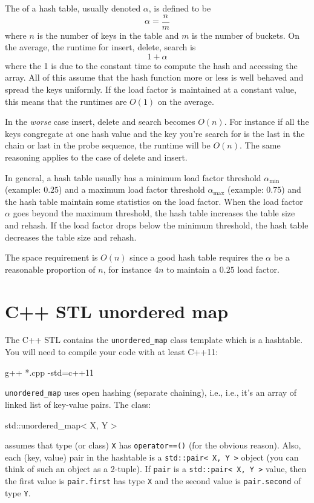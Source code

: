 The  of a hash table, usually denoted $\alpha$, 
is defined to be
\[
\alpha = \frac{n}{m}
\]
where $n$ is the number of keys in the table and $m$ is the number of buckets.
On the average, the runtime for insert, delete, search is
\[
1 + \alpha
\]
where the 1 is due to the constant time to compute the hash and accessing the array.
All of this assume that the hash function more or less is well behaved and spread
the keys uniformly.
If the load factor is maintained at a constant value, this means
that the runtimes are $O(1)$ on the average.

In the \textit{worse} case 
insert, delete and search becomes $O(n)$.
For instance if all the keys congregate at one hash value and the 
key you're search for is the last in the chain or last in the probe sequence,
the runtime will be $O(n)$.
The same reasoning applies to the case of delete and insert.

In general, a hash table usually has a minimum load factor threshold
$\alpha_{\operatorname{min}}$ (example: $0.25$)
and a maximum load factor threshold
$\alpha_{\operatorname{max}}$ (example: $0.75$)
and the hash table maintain some statistics on the load factor.
When the load factor $\alpha$ goes beyond the maximum threshold, 
the hash table increases the table size and rehash.
If the load factor drops below the minimum threshold, the hash table
decreases the table size and rehash.

The space requirement is $O(n)$ since 
a good hash table requires the $\alpha$ be a reasonable
proportion of $n$, for instance $4n$ to maintain a $0.25$ load factor.



\newpage
\section{C++ STL unordered map}

The C++ STL contains the \verb!unordered_map! class template
which is a hashtable.
You will need to compile your code with at least C++11:
\begin{console}
g++ *.cpp -std=c++11
\end{console}
\verb!unordered_map! uses open hashing (separate chaining), i.e., 
i.e., it's an array of linked list of key-value pairs.
The class:
\begin{console}
std::unordered_map< X, Y >
\end{console}
assumes that type (or class) \verb!X! has
\verb!operator==()!
(for the obvious reason).
Also, each (key, value) pair in the hashtable
is a \verb!std::pair< X, Y >! object
(you can think of such an object as a 2-tuple).
If \verb!pair! is a
\verb!std::pair< X, Y >! value,
then the first value is \verb!pair.first! has type \verb!X!
and the second value is \verb!pair.second! of type \verb!Y!.

